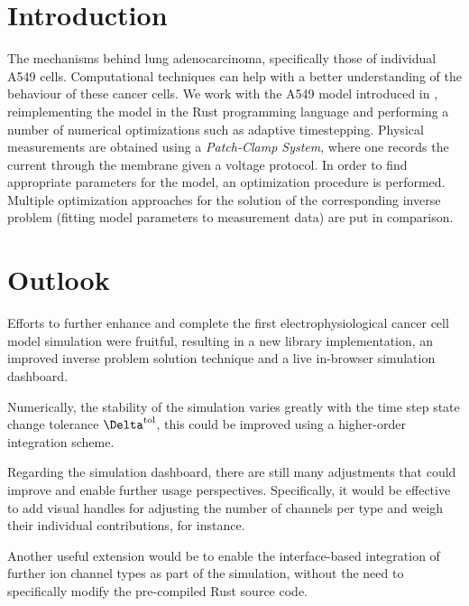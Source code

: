 \section{Introduction}
The mechanisms behind lung adenocarcinoma, specifically those of individual A549 cells.
Computational techniques can help with a better understanding of the behaviour of these cancer cells.
We work with the A549 model introduced in \cite{2021-A549-model,2024-calcium-channels}, reimplementing the model in the Rust programming language and performing a number of numerical optimizations such as adaptive timestepping.
Physical measurements are obtained using a \textit{Patch-Clamp System}, where one records the current through the membrane given a voltage protocol.
In order to find appropriate parameters for the model, an optimization procedure is performed.
Multiple optimization approaches for the solution of the corresponding inverse problem (fitting model parameters to measurement data) are put in comparison.




\section{Outlook}
Efforts to further enhance and complete the first electrophysiological cancer cell model simulation were fruitful, resulting in a new library implementation, an improved inverse problem solution technique and a live in-browser simulation dashboard.

Numerically, the stability of the simulation varies greatly with the time step state change tolerance $\Delta^{\rm tol}$, this could be improved using a higher-order integration scheme.

Regarding the simulation dashboard, there are still many adjustments that could improve and enable further usage perspectives.
Specifically, it would be effective to add visual handles for adjusting the number of channels per type and weigh their individual contributions, for instance.

Another useful extension would be to enable the interface-based integration of further ion channel types as part of the simulation, without the need to specifically modify the pre-compiled Rust source code.
